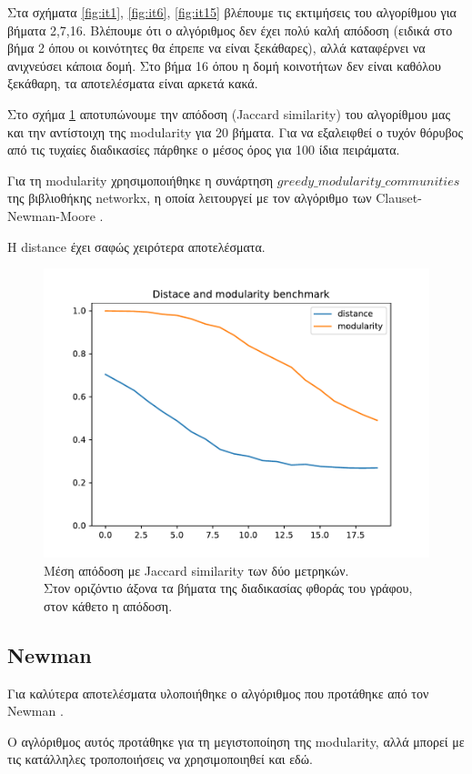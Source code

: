 \documentclass[12pt, letterpaper]{article}
\newcommand{\en}{\selectlanguage{english}}
\newcommand{\gr}{\selectlanguage{greek}}
\begin{document}
Στα σχήματα \ref{fig:it1}, \ref{fig:it6}, \ref{fig:it15} βλέπουμε τις εκτιμήσεις του 
αλγορίθμου για βήματα 2,7,16. Βλέπουμε ότι ο αλγόριθμος δεν έχει πολύ καλή απόδοση 
(ειδικά στο βήμα 2 όπου οι κοινότητες θα έπρεπε να είναι ξεκάθαρες), αλλά καταφέρνει 
να ανιχνεύσει κάποια δομή. Στο βήμα 16 όπου η δομή κοινοτήτων δεν είναι καθόλου ξεκάθαρη, 
τα αποτελέσματα είναι αρκετά κακά.

Στο σχήμα \ref{bench1} αποτυπώνουμε την απόδοση (\textlatin{Jaccard similarity})
του αλγορίθμου μας και την αντίστοιχη της \textlatin{modularity} για 20 βήματα.  
Για να εξαλειφθεί ο τυχόν θόρυβος από τις τυχαίες διαδικασίες πάρθηκε ο μέσος όρος 
για 100 ίδια πειράματα. 

Για τη \textlatin{modularity} χρησιμοποιήθηκε η συνάρτηση $greedy\_modularity\_communities$ της 
βιβλιοθήκης \textlatin{networkx}, η οποία λειτουργεί με τον αλγόριθμο των \en Clauset-Newman-Moore \gr 
\cite{Clauset:fastgreedy}\relax.
 
Η \textlatin{distance} έχει σαφώς χειρότερα αποτελέσματα.


\begin{figure}
  \centering
  \includegraphics[width=0.5\linewidth]{benchmark.pdf}
  \caption{Μέση απόδοση με \textlatin{Jaccard similarity} των δύο μετρηκών. \\
  Στον οριζόντιο άξονα τα βήματα της διαδικασίας φθοράς του γράφου, στον κάθετο η απόδοση.}
  \label{bench1}
\end{figure}


\subsection{\textlatin{Newman}}

Για καλύτερα αποτελέσματα υλοποιήθηκε ο αλγόριθμος που προτάθηκε από τον \textlatin{Newman} 
\cite{Newman}\relax. 

Ο αγλόριθμος αυτός προτάθηκε για τη μεγιστοποίηση της \en modularity, \gr αλλά μπορεί με τις κατάλληλες τροποποιήσεις να χρησιμοποιηθεί και εδώ.
\end{document}
